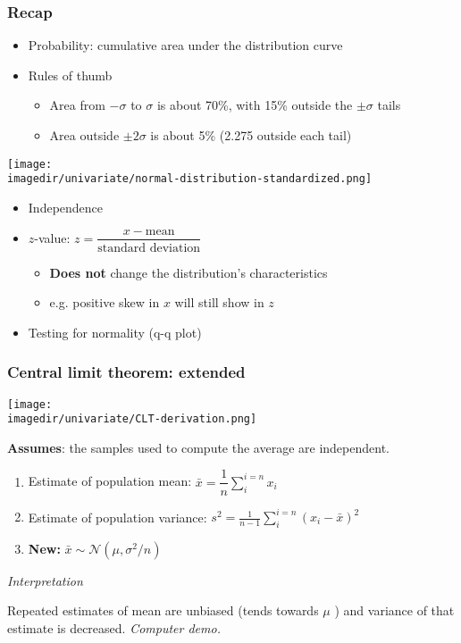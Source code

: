 \begin{frame}\frametitle{Recap}
	\begin{itemize}
		\item	Probability: cumulative area under the distribution curve
		\item	Rules of thumb
		\begin{itemize}
			\item	Area from $-\sigma$ to $\sigma$ is about 70\%, with 15\% outside the $\pm \sigma$ tails
			\item	Area outside $\pm 2\sigma$ is about 5\% (2.275 outside each tail)
		\end{itemize}
	\end{itemize}
	\begin{center}
		\texttt{[image: \\imagedir/univariate/normal-distribution-standardized.png]}
	\end{center}
	\vspace{-16pt}
	\begin{itemize}
		\item	Independence
		\item	$z$-value: $z = \dfrac{x - \text{mean}}{\text{standard deviation}}$
		\vspace{8pt}
		\begin{itemize}
			\item	\textbf{Does not} change the distribution's characteristics
			\item	e.g. positive skew in $x$ will still show in $z$
		\end{itemize}
		\item	Testing for normality (q-q plot)
	\end{itemize}
\end{frame}

\begin{frame}\frametitle{Central limit theorem: extended}

	\texttt{[image: \\imagedir/univariate/CLT-derivation.png]}

	\textbf{Assumes}: the samples used to compute the average are independent.
	\begin{enumerate}
		\item	Estimate of population mean: $\bar{x} = \displaystyle \dfrac{1}{n} \sum_i^{i=n}{x_i}$
		\item	Estimate of population variance: $s^2 =\displaystyle \frac{1}{n-1}\sum_i^{i=n}{(x_i - \bar{x})^2}$
		\item	\textbf{New:} $\bar{x} \sim \mathcal{N}\left(\mu, \sigma^2/n \right)$  \hfill{\color{myGreen}{$\longleftarrow$ really powerful statement}}
	\end{enumerate}

	\emph{Interpretation}

	Repeated estimates of mean are unbiased (tends towards $\mu$ {\color{myOrange}{$\leftarrow$ of the distribution sampled from!}}) and variance of that estimate is decreased. \emph{Computer demo.}
\end{frame}

